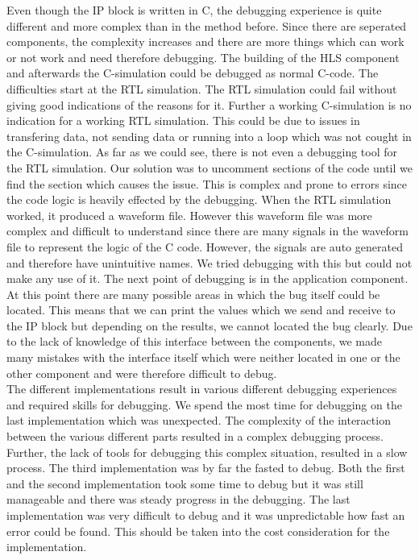 \documentclass[conference]{IEEEtran}
\begin{document}
Even though the IP block is written in C, the debugging experience is quite different and more complex than in the method before. Since there are seperated components, the complexity increases and there are more things which can work or not work and need therefore debugging. The building of the HLS component and afterwards the C-simulation could be debugged as normal C-code. The difficulties start at the RTL simulation. The RTL simulation could fail without giving good indications of the reasons for it. Further a working C-simulation is no indication for a working RTL simulation. This could be due to issues in transfering data, not sending data or running into a loop which was not cought in the C-simulation. As far as we could see, there is not even a debugging tool for the RTL simulation. Our solution was to uncomment sections of the code until we find the section which causes the issue. This is complex and prone to errors since the code logic is heavily effected by the debugging. When the RTL simulation worked, it produced a waveform file. However this waveform file was more complex and difficult to understand since there are many signals in the waveform file to represent the logic of the C code. However, the signals are auto generated and therefore have unintuitive names. We tried debugging with this but could not make any use of it. The next point of debugging is in the application component. At this point there are many possible areas in which the bug itself could be located. This means that we can print the values which we send and receive to the IP block but depending on the results, we cannot located the bug clearly. Due to the lack of knowledge of this interface between the components, we made many mistakes with the interface itself which were neither located in one or the other component and were therefore difficult to debug. \\
The different implementations result in various different debugging experiences and required skills for debugging. We spend the most time for debugging on the last implementation which was unexpected. The complexity of the interaction between the various different parts resulted in a complex debugging process. Further, the lack of tools for debugging this complex situation, resulted in a slow process. The third implementation was by far the fasted to debug. Both the first and the second implementation took some time to debug but it was still manageable and there was steady progress in the debugging. The last implementation was very difficult to debug and it was unpredictable how fast an error could be found. This should be taken into the cost consideration for the implementation.
\end{document}
